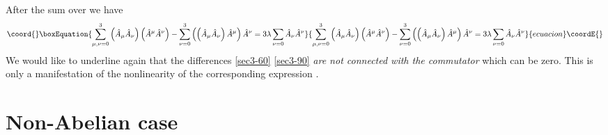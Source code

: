 \documentclass[a4paper,a4paper]{article}
\begin{document}
After the sum over \myHighlight{$\mu$}\coordHE{} we have 
\begin{equation}\coord{}\boxEquation{
  \sum^3_{\mu , \nu = 0} \left( 
  \hat{A}_\mu \hat{A}_\nu
  \right)
  \left( 
  \hat{A}^\mu \hat{A}^\nu
  \right ) - 
  \sum^3_{\nu = 0} \left( \left( \hat{A}_\mu \hat{A}_\nu 
  \right) \hat{A}^\mu \right ) \hat{A}^\nu = 
  3 \lambda \sum_{\nu = 0} \hat A_\nu \hat A^\nu 
\label{sec3-90}
}{
  \sum^3_{\mu , \nu = 0} \left( 
  \hat{A}_\mu \hat{A}_\nu
  \right)
  \left( 
  \hat{A}^\mu \hat{A}^\nu
  \right ) - 
  \sum^3_{\nu = 0} \left( \left( \hat{A}_\mu \hat{A}_\nu 
  \right) \hat{A}^\mu \right ) \hat{A}^\nu = 
  3 \lambda \sum_{\nu = 0} \hat A_\nu \hat A^\nu 
}{ecuacion}\coordE{}\end{equation}
We would like to underline again that the differences \eqref{sec3-60} 
\eqref{sec3-90} 
\textit{are not connected with the commutator} \coordHE{} 
which can be zero. This is only a manifestation of the nonlinearity 
of the corresponding expression 
\coordHE{}. 

\section{Non-Abelian case}
\end{document}
